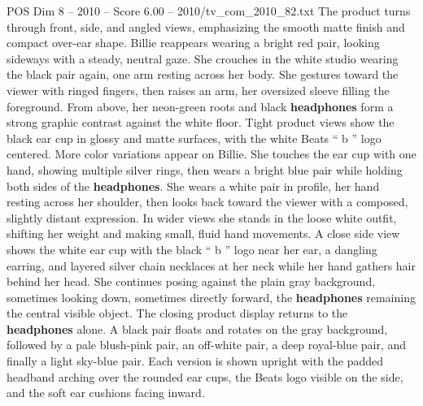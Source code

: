 \begin{textsample}{POS Dim 8 – 2010 – Score 6.00 – 2010/tv\_com\_2010\_82.txt}
The product turns through front, side, and angled views, emphasizing the smooth matte finish and compact over-ear shape.
Billie reappears wearing a bright red pair, looking sideways with a steady, neutral gaze.
She crouches in the white studio wearing the black pair again, one arm resting across her body.
She gestures toward the viewer with ringed fingers, then raises an arm, her oversized sleeve filling the foreground.
From above, her neon-green roots and black \textbf{headphones} form a strong graphic contrast against the white floor.
Tight product views show the black ear cup in glossy and matte surfaces, with the white Beats “ b ” logo centered.
More color variations appear on Billie.
She touches the ear cup with one hand, showing multiple silver rings, then wears a bright blue pair while holding both sides of the \textbf{headphones}.
She wears a white pair in profile, her hand resting across her shoulder, then looks back toward the viewer with a composed, slightly distant expression.
In wider views she stands in the loose white outfit, shifting her weight and making small, fluid hand movements.
A close side view shows the white ear cup with the black “ b ” logo near her ear, a dangling earring, and layered silver chain necklaces at her neck while her hand gathers hair behind her head.
She continues posing against the plain gray background, sometimes looking down, sometimes directly forward, the \textbf{headphones} remaining the central visible object.
The closing product display returns to the \textbf{headphones} alone.
A black pair floats and rotates on the gray background, followed by a pale blush-pink pair, an off-white pair, a deep royal-blue pair, and finally a light sky-blue pair.
Each version is shown upright with the padded headband arching over the rounded ear cups, the Beats logo visible on the side, and the soft ear cushions facing inward.

\end{textsample}
